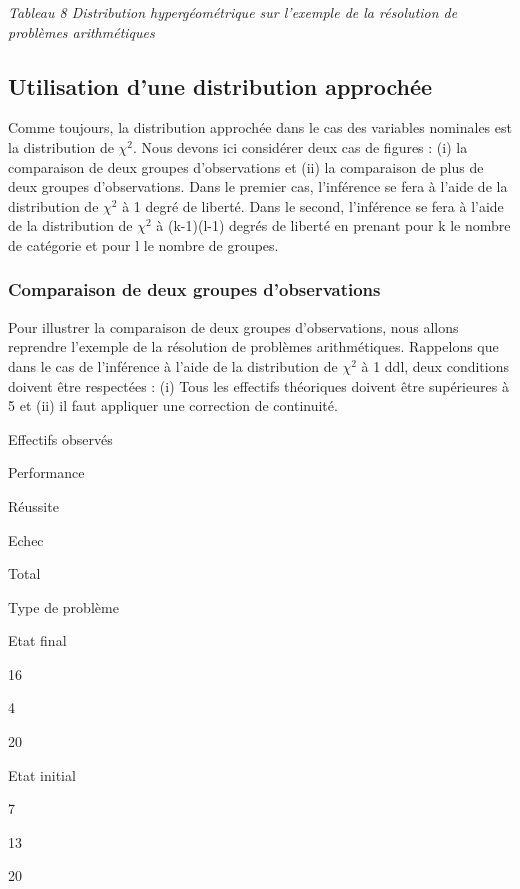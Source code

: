 \documentclass[]{book}
\theoremstyle{definition}
\theoremstyle{definition}
\theoremstyle{definition}
\theoremstyle{remark}
\begin{document}
\emph{Tableau 8 Distribution hypergéométrique sur l'exemple de la
résolution de problèmes arithmétiques}

\hypertarget{utilisation-dune-distribution-approchee-4}{%
\subsection{Utilisation d'une distribution
approchée}\label{utilisation-dune-distribution-approchee-4}}

Comme toujours, la distribution approchée dans le cas des variables
nominales est la distribution de \(\chi ^{2}\). Nous devons ici
considérer deux cas de figures : (i) la comparaison de deux groupes
d'observations et (ii) la comparaison de plus de deux groupes
d'observations. Dans le premier cas, l'inférence se fera à l'aide de la
distribution de \(\chi ^{2}\) à 1 degré de liberté. Dans le second,
l'inférence se fera à l'aide de la distribution de \(\chi ^{2}\) à
(k-1)(l-1) degrés de liberté en prenant pour k le nombre de catégorie et
pour l le nombre de groupes.

\hypertarget{comparaison-de-deux-groupes-dobservations}{%
\subsubsection{Comparaison de deux groupes
d'observations}\label{comparaison-de-deux-groupes-dobservations}}

Pour illustrer la comparaison de deux groupes d'observations, nous
allons reprendre l'exemple de la résolution de problèmes arithmétiques.
Rappelons que dans le cas de l'inférence à l'aide de la distribution de
\(\chi ^{2}\) à 1 ddl, deux conditions doivent être respectées : (i)
Tous les effectifs théoriques doivent être supérieures à 5 et (ii) il
faut appliquer une correction de continuité.

Effectifs observés

Performance

Réussite

Echec

Total

Type de problème

Etat final

16

4

20

Etat initial

7

13

20
\end{document}
